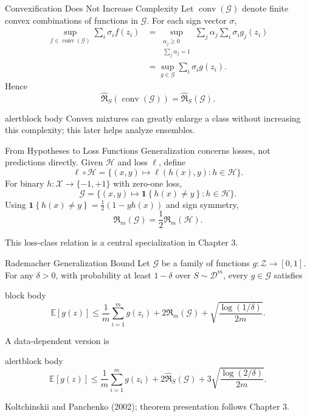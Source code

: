 \documentclass[aspectratio=169,10pt]{beamer}
\newcommand{\X}{\mathcal{X}}
\newcommand{\Z}{\mathcal{Z}}
\newcommand{\D}{\mathcal{D}}
\newcommand{\Hc}{\mathcal{H}}
\newcommand{\Gc}{\mathcal{G}}
\newcommand{\Rad}{\mathfrak{R}}
\newcommand{\RadS}{\widehat{\mathfrak{R}}_S}
\newcommand{\ind}[1]{\mathbf{1}\!\left\{#1\right\}}
\newcommand{\pmone}{\{-1,+1\}}
\newcommand{\E}{\mathbb{E}}
\newcommand{\SourceNote}[1]{%
  \vfill
  \begin{flushright}
    {\scriptsize\color{midgray}#1}
  \end{flushright}
}
\newcommand{\OrangeBox}[1]{%
  \begin{beamercolorbox}[rounded=true,sep=0.22cm,wd=\linewidth]{alertblock body}
    #1
  \end{beamercolorbox}%
}
\begin{document}
\begin{frame}[t]{Convexification Does Not Increase Complexity}
  \vspace{0.03cm}
  \small
  Let $\operatorname{conv}(\Gc)$ denote finite convex combinations of functions in $\Gc$. For each sign vector $\sigma$,
  \begin{align*}
    \sup_{f\in\operatorname{conv}(\Gc)}\sum_i\sigma_i f(z_i)
    &=\sup_{\substack{\alpha_j\ge0\\\sum_j\alpha_j=1}}
      \sum_j\alpha_j\sum_i\sigma_i g_j(z_i)\\
    &=\sup_{g\in\Gc}\sum_i\sigma_i g(z_i).
  \end{align*}
  Hence
  \[
    \boxed{\RadS(\operatorname{conv}(\Gc))=\RadS(\Gc).}
  \]
  \vspace{0.08cm}
  \OrangeBox{\footnotesize Convex mixtures can greatly enlarge a class without increasing this complexity; this later helps analyze ensembles.}
\end{frame}

\begin{frame}[t]{From Hypotheses to Loss Functions}
  \vspace{0.06cm}
  Generalization concerns losses, not predictions directly. Given $\Hc$ and loss $\ell$, define
  \[
    \ell\circ\Hc
    =\bigl\{(x,y)\mapsto \ell(h(x),y):h\in\Hc\bigr\}.
  \]
  For binary $h:\X\to\pmone$ with zero-one loss,
  \[
    \Gc=\{(x,y)\mapsto\ind{h(x)\ne y}:h\in\Hc\}.
  \]
  Using $\ind{h(x)\ne y}=\tfrac12(1-yh(x))$ and sign symmetry,
  \[
    \boxed{\Rad_m(\Gc)=\frac12\Rad_m(\Hc).}
  \]
  \SourceNote{This loss-class relation is a central specialization in Chapter 3.}
\end{frame}

\begin{frame}[t]{Rademacher Generalization Bound}
  \vspace{0.02cm}
  Let $\Gc$ be a family of functions $g:\Z\to[0,1]$. For any $\delta>0$, with probability at least $1-\delta$ over $S\sim\D^m$, every $g\in\Gc$ satisfies
  \begin{beamercolorbox}[rounded=true,sep=0.18cm,wd=\linewidth]{block body}
    \[
      \E[g(z)]
      \le \frac1m\sum_{i=1}^m g(z_i)
      +2\Rad_m(\Gc)
      +\sqrt{\frac{\log(1/\delta)}{2m}}.
    \]
  \end{beamercolorbox}
  A data-dependent version is
  \begin{beamercolorbox}[rounded=true,sep=0.18cm,wd=\linewidth]{alertblock body}
    \[
      \E[g(z)]
      \le \frac1m\sum_{i=1}^m g(z_i)
      +2\RadS(\Gc)
      +3\sqrt{\frac{\log(2/\delta)}{2m}}.
    \]
  \end{beamercolorbox}
  \SourceNote{Koltchinskii and Panchenko (2002); theorem presentation follows Chapter 3.}
\end{frame}
\end{document}
